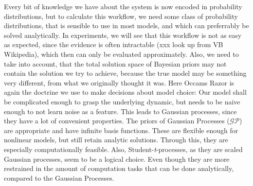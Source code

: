 Every bit of knowledge we have about the system is now encoded in probability distributions, but to calculate this workflow, we need some class of probability distributions, that is sensible to use in most models, and which can preferrably be solved analytically. In experiments, we will see that this workflow is not as easy as expected, since the evidence is often intractable (xxx look up from VB Wikipedia), which then can only be evaluated approximately. Also, we need to take into account, that the total solution space of Bayesian priors may not contain the solution we try to achieve, because the true model may be something very different, from what we originally thought it was. Here Occams Razor is again the doctrine we use to make decisions about model choice: Our model shall be complicated enough to grasp the underlying dynamic, but needs to be naive enough to not learn noise as a feature. This leads to Gaussian processes, since they have a lot of convenient properties. The priors of Gaussian Processes ($\mathcal{GP}$) are appropriate and have infinite basis functions. These are flexible enough for nonlinear models, but still retain analytic solutions. Through this, they are especially computationally feasible. Also, Student-\textit{t}-processes, as they are scaled Gaussian processes, seem to be a logical choice. Even though they are more restrained in the amount of computation tasks that can be done analytically, compared to the Gaussian Processes. 

